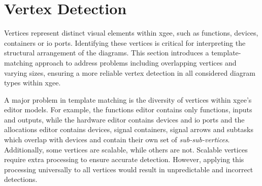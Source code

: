 \section{Vertex Detection}
\label{sec:vertex_detection}
Vertices represent distinct visual elements within \acrshort{xgee}, such as functions, devices, containers or \acrshort{io} ports. Identifying these vertices is critical for interpreting the structural arrangement of the diagrams. This section introduces a template-matching approach to address problems including overlapping vertices and varying sizes, ensuring a more reliable vertex detection in all considered diagram types within \acrshort{xgee}.

A major problem in template matching is the diversity of vertices within \acrshort{xgee}'s editor models. For example, the functions editor contains only functions, inputs and outputs, while the hardware editor contains devices and \acrshort{io} ports and the allocations editor contains devices, signal containers, signal arrows and subtasks which overlap with devices and contain their own set of \textit{sub-sub-vertices}. Additionally, some vertices are scalable, while others are not. Scalable vertices require extra processing to ensure accurate detection. However, applying this processing universally to all vertices would result in unpredictable and incorrect detections.

